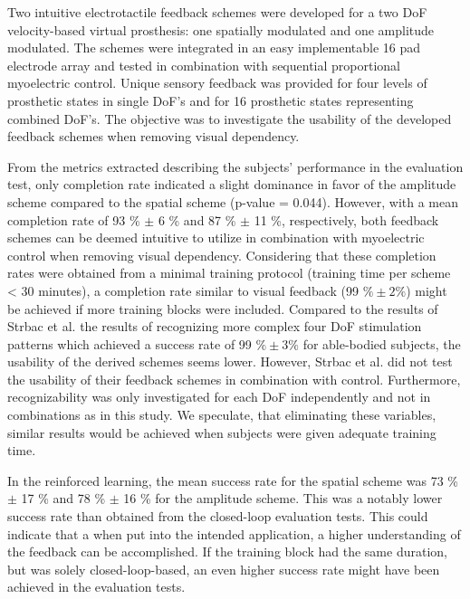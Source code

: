 Two intuitive electrotactile feedback schemes were developed for a two DoF velocity-based virtual prosthesis: one spatially modulated and one amplitude modulated. The schemes were integrated in an easy implementable 16 pad electrode array and tested in combination with sequential proportional myoelectric control. Unique sensory feedback was provided for four levels of prosthetic states in single DoF's and for 16 prosthetic states representing combined DoF's. The objective was to investigate the usability of the developed feedback schemes when removing visual dependency.

From the metrics extracted describing the subjects' performance in the evaluation test, only completion rate indicated a slight  dominance in favor of the amplitude scheme compared to the spatial scheme (p-value = 0.044). However, with a mean completion rate of 93 \% $\pm$ 6 \% and 87 \% $\pm$ 11 \%, respectively, both feedback schemes can be deemed intuitive to utilize in combination with myoelectric control when removing visual dependency. Considering that these completion rates were obtained from a minimal training protocol (training time per scheme < 30 minutes), a completion rate similar to visual feedback (99 $\% \pm 2\%$) might be achieved if more training blocks were included.
Compared to the results of Strbac et al. \cite{Strbac2016} the results of recognizing more complex four DoF stimulation patterns which achieved a success rate of 99 $\% \pm 3\%$ for able-bodied subjects, the usability of the derived schemes seems lower. However, Strbac et al. did not test the usability of their feedback schemes in combination with control. Furthermore, recognizability was only investigated for each DoF independently and not in combinations as in this study. We speculate, that eliminating these variables, similar results would be achieved when subjects were given adequate training time.       

In the reinforced learning, the mean success rate for the spatial scheme was 73 \%  $\pm$ 17 \% and 78 \%  $\pm$ 16 \% for the amplitude scheme. This was a notably lower success rate than obtained from the closed-loop evaluation tests. This could indicate that a when put into the intended application, a higher understanding of the feedback can be accomplished. If the training block had the same duration, but was solely closed-loop-based, an even higher success rate might have been achieved in the evaluation tests. 


